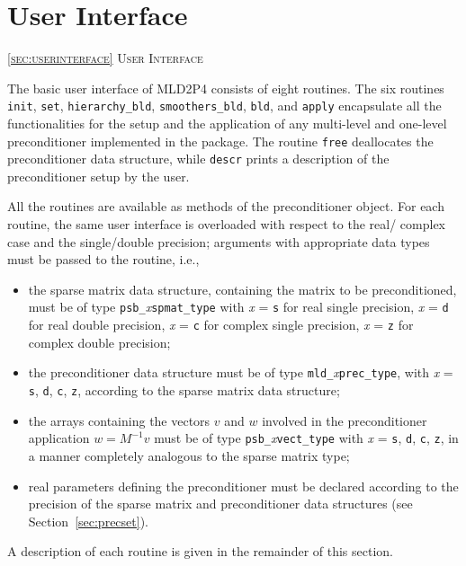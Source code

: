 \section{User Interface\label{sec:userinterface}}
         {\textsc{\ref{sec:userinterface} User Interface}}

The basic user interface of MLD2P4 consists of eight routines. The six
routines \verb|init|, \verb|set|,
\verb|hierarchy_bld|, \verb|smoothers_bld|,
\verb|bld|, and \verb|apply| encapsulate all the
functionalities for the setup and the application of any multi-level and one-level
preconditioner implemented in the package. 
The routine \verb|free| deallocates the preconditioner data structure, while
\verb|descr| prints a description of the preconditioner setup by the user.

All the routines are available as methods of the preconditioner object.
For each routine, the same user interface is overloaded with
respect to the real/ complex case and the single/double precision;
arguments with appropriate data types must be passed to the routine,
i.e.,
\begin{itemize}
\item the sparse matrix data structure, containing the matrix to be
  preconditioned, must be of type \verb|psb_|\emph{x}\verb|spmat_type|
	with \emph{x} = \verb|s| for real single precision, \emph{x} = \verb|d|
	for real double precision, \emph{x} = \verb|c| for complex single precision,
	\emph{x} = \verb|z| for complex double precision;
\item the preconditioner data structure must be of type
  \verb|mld_|\emph{x}\verb|prec_type|, with \emph{x} =    
  \verb|s|, \verb|d|, \verb|c|, \verb|z|, according to the sparse
  matrix data structure;
\item the arrays containing the vectors $v$ and $w$ involved in
  the preconditioner application $w=M^{-1}v$ must be of type   
  \verb|psb_|\emph{x}\verb|vect_type| with \emph{x} =    
  \verb|s|, \verb|d|, \verb|c|, \verb|z|, in a manner completely
  analogous to the sparse matrix type;
\item real parameters defining the preconditioner must be declared
  according to the precision of the sparse matrix and preconditioner
  data structures (see Section~\ref{sec:precset}).
\end{itemize}
A description of each routine is given in the remainder of this section.

\clearpage

